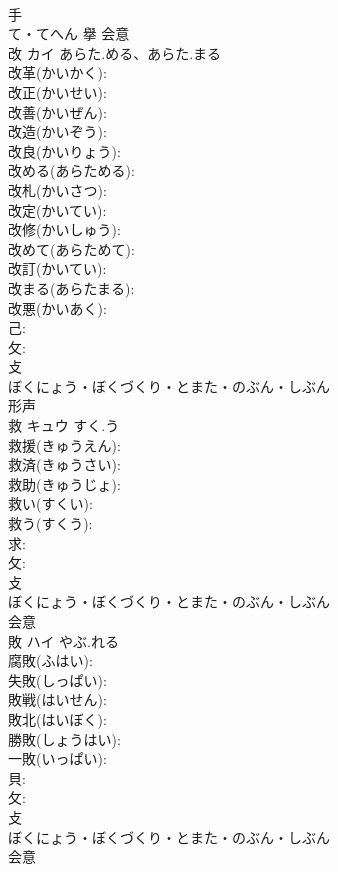 \documentclass[8pt]{extreport}
\begin{document}
\begin{CJK}{UTF8}{min}
\\	手	
\\	て・てへん	擧	会意 
\\	改	カイ	あらた.める、あらた.まる		
\\	改革(かいかく): 
\\	改正(かいせい): 
\\	改善(かいぜん): 
\\	改造(かいぞう): 
\\	改良(かいりょう): 
\\	改める(あらためる): 
\\	改札(かいさつ): 
\\	改定(かいてい): 
\\	改修(かいしゅう): 
\\	改めて(あらためて): 
\\	改訂(かいてい): 
\\	改まる(あらたまる): 
\\	改悪(かいあく): 
\\	己: 
\\	攵: 
\\	攴	
\\	ぼくにょう・ぼくづくり・とまた・のぶん・しぶん	
\\	形声 
\\	救	キュウ	すく.う		
\\	救援(きゅうえん): 
\\	救済(きゅうさい): 
\\	救助(きゅうじょ): 
\\	救い(すくい): 
\\	救う(すくう): 
\\	求: 
\\	攵: 
\\	攴	
\\	ぼくにょう・ぼくづくり・とまた・のぶん・しぶん	
\\	会意 
\\	敗	ハイ	やぶ.れる		
\\	腐敗(ふはい): 
\\	失敗(しっぱい): 
\\	敗戦(はいせん): 
\\	敗北(はいぼく): 
\\	勝敗(しょうはい): 
\\	一敗(いっぱい): 
\\	貝: 
\\	攵: 
\\	攴	
\\	ぼくにょう・ぼくづくり・とまた・のぶん・しぶん	
\\	会意 

\end{CJK}
\end{document}
